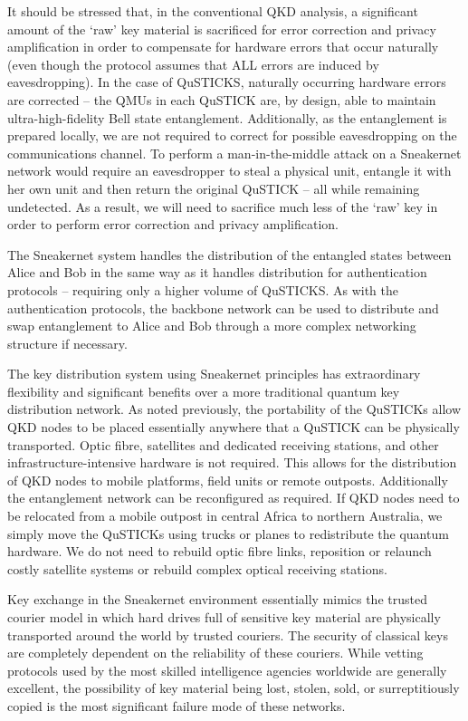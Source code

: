 \documentclass[twocolumn, aps, rmp, amsmath, amssymb, nofootinbib, superscriptaddress, longbibliography, floatfix, table-of-contents, eqsecnum]{revtex4-2}
\begin{document}
It should be stressed that, in the conventional QKD analysis, a significant amount of the `raw' key material is sacrificed for error correction and privacy amplification in order to compensate for hardware errors that occur naturally (even though the protocol assumes that ALL errors are induced by eavesdropping). In the case of QuSTICKS, naturally occurring hardware errors are corrected -- the QMUs in each QuSTICK are, by design, able to maintain ultra-high-fidelity Bell state entanglement. Additionally, as the entanglement is prepared locally, we are not required to correct for possible eavesdropping on the communications channel. To perform a man-in-the-middle attack on a Sneakernet network would require an eavesdropper to steal a physical unit, entangle it with her own unit and then return the original QuSTICK -- all while remaining undetected. As a result, we will need to sacrifice much less of the `raw' key in order to perform error correction and privacy amplification. 

The Sneakernet system handles the distribution of the entangled states between Alice and Bob in the same way as it handles distribution for authentication protocols -- requiring only a higher volume of QuSTICKS. As with the authentication protocols, the backbone network can be used to distribute and swap entanglement to Alice and Bob through a more complex networking structure if necessary. 

The key distribution system using Sneakernet principles has extraordinary flexibility and significant benefits over a more traditional quantum key distribution network. As noted previously, the portability of the QuSTICKs allow QKD nodes to be placed essentially anywhere that a QuSTICK can be physically transported. Optic fibre, satellites and dedicated receiving stations, and other infrastructure-intensive hardware is not required. This allows for the distribution of QKD nodes to mobile platforms, field units or remote outposts. Additionally the entanglement network can be reconfigured as required. If QKD nodes need to be relocated from a mobile outpost in central Africa to northern Australia, we simply move the QuSTICKs using trucks or planes to redistribute the quantum hardware. We do not need to rebuild optic fibre links, reposition or relaunch costly satellite systems or rebuild complex optical receiving stations. 

Key exchange in the Sneakernet environment essentially mimics the trusted courier model in which hard drives full of sensitive key material are physically transported around the world by trusted couriers. The security of classical keys are completely dependent on the reliability of these couriers. While vetting protocols used by the most skilled intelligence agencies worldwide are generally excellent, the possibility of key material being lost, stolen, sold, or surreptitiously copied is the most significant failure mode of these networks. 
\end{document}
